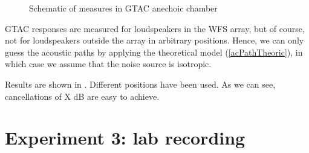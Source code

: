 \begin{figure}
	\centering
	\caption[Schematic of measures in GTAC anechoic chamber]{Schematic of measures in GTAC anechoic chamber}
	\label{GTAC360micro}
\end{figure}


GTAC responses are measured for loudspeakers in the WFS array, but of course, not for loudspeakers outside the array in arbitrary positions. Hence, we can only guess the acoustic paths by applying the theoretical model (\autoref{acPathTheoric}), in which case we assume that the noise source is isotropic.

Results are shown in . Different positions have been used. As we can see, cancellations of X dB are easy to achieve.



\section{Experiment 3: lab recording}
